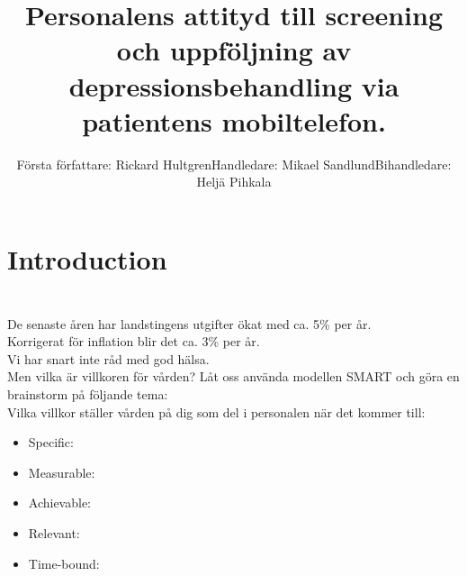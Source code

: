 \documentclass[english]{beamer}
\begin{document}
\title{Personalens attityd till screening och uppföljning av depressionsbehandling via patientens mobiltelefon.}
\author[]{Första författare: Rickard Hultgren\newline Handledare: Mikael Sandlund\newline Bihandledare: Heljä Pihkala}


\begin{frame}
	\titlepage
\end{frame}

\section{Introduction}
\begin{frame}
	\frametitle{}
	\frametitle{}
	\\
	De senaste åren har landstingens utgifter ökat med ca. 5\% per år.\\
	Korrigerat för inflation blir det ca. 3\% per år.\\
	Vi har snart inte råd med god hälsa.\\
	\pause
	\textcolor{lila}{Men vilka är villkoren för vården? Låt oss använda modellen SMART och göra en brainstorm på följande tema:\\Vilka villkor ställer vården på dig som del i personalen när det kommer till:}\\
	\begin{itemize}
		\item \textcolor{lila}{Specific:}
		\item\textcolor{lila}{Measurable:}
		\item\textcolor{lila}{Achievable:}
		\item\textcolor{lila}{Relevant:}
		\item\textcolor{lila}{Time-bound:}
	\end{itemize}
\end{frame}
\end{document}
